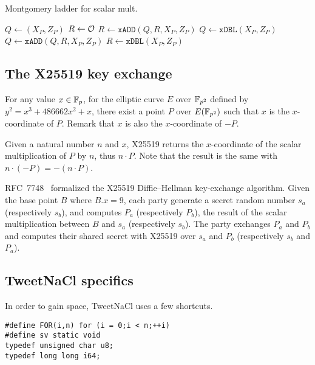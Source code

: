 \begin{algorithm}
\caption{Montgomery ladder for scalar mult.}
\label{montgomery-ladder}
\begin{algorithmic}
\STATE $Q \leftarrow (X_P, Z_P)$
\STATE $R \leftarrow \mathcal{O}$
    \STATE $R \leftarrow \texttt{xADD}(Q,R,X_P,Z_P)$
    \STATE $Q \leftarrow \texttt{xDBL}(X_P, Z_P)$
  \ELSE
  \STATE $Q \leftarrow \texttt{xADD}(Q,R,X_P,Z_P)$
  \STATE $R \leftarrow \texttt{xDBL}(X_P, Z_P)$
  \ENDIF
\ENDFOR
\end{algorithmic}
\end{algorithm}

\subsection{The X25519 key exchange}
\label{preliminaries:A}


For any value $x \in \mathbb{F}_{p}$, for the elliptic curve $E$ over $\mathbb{F}_{p^2}$
defined by $y^2 = x^3 + 486662 x^2 + x$, there exist a point $P$ over $E(\mathbb{F}_{p^2})$
such that $x$ is the $x$-coordinate of $P$.
Remark that $x$ is also the $x$-coordinate of $-P$.

Given a natural number $n$ and $x$, X25519 returns the $x$-coordinate of the
scalar multiplication of $P$ by $n$, thus $n \cdot P$. Note that the result is the
same with $n \cdot (-P) = -(n \cdot P)$.

RFC~7748~\cite{rfc7748} formalized the X25519 Diffie–Hellman key-exchange algorithm.
Given the base point $B$ where $B.x=9$, each party generate a secret random number
$s_a$ (respectively $s_b$), and computes $P_a$ (respectively $P_b$), the result
of the scalar multiplication between $B$ and $s_a$ (respectively $s_b$).
The party exchanges $P_a$ and $P_b$ and computes their shared secret with X25519
over $s_a$ and $P_b$ (respectively $s_b$ and $P_a$).

\subsection{TweetNaCl specifics}
\label{preliminaries:B}
In order to gain space, TweetNaCl uses a few shortcuts.
\begin{lstlisting}[language=Ctweetnacl]
#define FOR(i,n) for (i = 0;i < n;++i)
#define sv static void
typedef unsigned char u8;
typedef long long i64;
\end{lstlisting}

